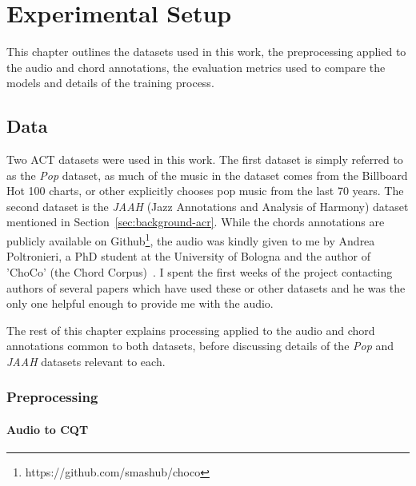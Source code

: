 \chapter{Experimental Setup}

This chapter outlines the datasets used in this work, the preprocessing applied to the audio and chord annotations, the evaluation metrics used to compare the models and details of the training process.

\section{Data}

Two ACT datasets were used in this work. The first dataset is simply referred to as the \emph{Pop} dataset, as much of the music in the dataset comes from the Billboard Hot 100 charts, or other explicitly chooses pop music from the last 70 years. The second dataset is the \emph{JAAH} (Jazz Annotations and Analysis of Harmony) dataset mentioned in Section~\ref{sec:background-acr}. While the chords annotations are publicly available on Github\footnote{https://github.com/smashub/choco}, the audio was kindly given to me by Andrea Poltronieri, a PhD student at the University of Bologna and the author of 'ChoCo' (the Chord Corpus)~\citep{Choco}. I spent the first weeks of the project contacting authors of several papers which have used these or other datasets and he was the only one helpful enough to provide me with the audio.

The rest of this chapter explains processing applied to the audio and chord annotations common to both datasets, before discussing details of the \emph{Pop} and \emph{JAAH} datasets relevant to each.

\subsection{Preprocessing}

\subsubsection{Audio to CQT}\label{sec:audio-to-cqt}

